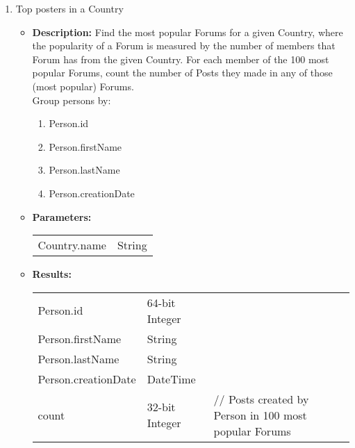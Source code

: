 {\begin{enumerate}
\begin{itemize}
                  \item \textbf{Limit:} 20 \\
                    \end{itemize}

      \item Top posters in a Country 
            \begin{itemize}
                \item \textbf{Description:}
                  Find the most popular Forums for a given Country,
                  where the popularity of a Forum is measured by the number of members that Forum has from the given Country.
                  For each member of the 100 most popular Forums,
                  count the number of Posts they made in any of those (most popular) Forums. \\
                  Group persons by:
                  \begin{enumerate}
                      \item Person.id
                      \item Person.firstName
                      \item Person.lastName
                      \item Person.creationDate
                  \end{enumerate}
                \item \textbf{Parameters:} \\
                    \begin{tabular}{ll}
                      Country.name & String \\ 
                    \end{tabular}
                \item \textbf{Results:} \\
                    \begin{tabular}{lll}
                      Person.id & 64-bit Integer & \\
                      Person.firstName & String & \\
                      Person.lastName & String & \\
                      Person.creationDate & DateTime & \\
                      count & 32-bit Integer & \parbox[t]{20cm}{ // Posts created by Person in 100 most popular Forums\strut}  \\
                    \end{tabular}


\end{itemize}
\end{enumerate}}
